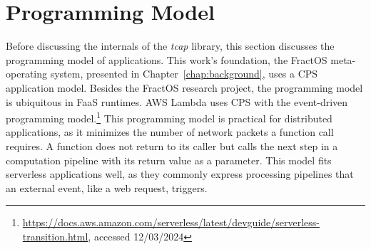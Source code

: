 %
%
%
%
%
%

%   
\section{Programming Model}\label{ref:programming-model}
Before discussing the internals of the \emph{tcap} library, this section discusses the programming model of applications. This work's foundation, the FractOS meta-operating system, presented in Chapter~\ref{chap:background}, uses a \ac{CPS} application model. Besides the FractOS research project, the programming model is ubiquitous in \ac{FaaS} runtimes. \ac{AWS} Lambda uses \ac{CPS} with the event-driven programming model.\footnote{\url{https://docs.aws.amazon.com/serverless/latest/devguide/serverless-transition.html}, accessed 12/03/2024} This programming model is practical for distributed applications, as it minimizes the number of network packets a function call requires. A function does not return to its caller but calls the next step in a computation pipeline with its return value as a parameter. This model fits serverless applications well, as they commonly express processing pipelines that an external event, like a web request, triggers.


